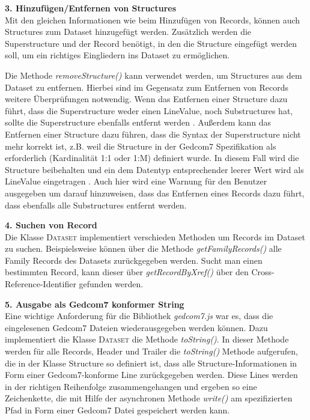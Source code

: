 \vspace{1em}
\textbf{3. Hinzufügen/Entfernen von Structures} \vspace{0.5em} \\
Mit den gleichen Informationen wie beim Hinzufügen von Records, können auch Structures zum Dataset hinzugefügt werden. Zusätzlich werden die Superstructure und der Record benötigt, in den die Structure eingefügt werden soll, um ein richtiges Eingliedern ins Dataset zu ermöglichen. 


Die Methode \textit{removeStructure()} kann verwendet werden, um Structures aus dem Dataset zu entfernen. Hierbei sind im Gegensatz zum Entfernen von Records weitere Überprüfungen notwendig. Wenn das Entfernen einer Structure dazu führt, dass die Superstructure weder einen LineValue, noch Substructures hat, sollte die Superstructure ebenfalls entfernt werden \cite{GEDCOM}. Außerdem kann das Entfernen einer Structure dazu führen, dass die Syntax der Superstructure nicht mehr korrekt ist, z.B. weil die Structure in der Gedcom7 Spezifikation als erforderlich (Kardinalität 1:1 oder 1:M) definiert wurde. In diesem Fall wird die Structure beibehalten und ein dem Datentyp entsprechender leerer Wert wird als LineValue eingetragen \cite{GEDCOM}. Auch hier wird eine Warnung für den Benutzer ausgegeben um darauf hinzuweisen, dass das Entfernen eines Records dazu führt, dass ebenfalls alle Substructures entfernt werden. 

\vspace{1em}
\textbf{4. Suchen von Record} \vspace{0.5em} \\
Die Klasse \textsc{Dataset} implementiert verschieden Methoden um Records im Dataset zu suchen. Beispielsweise können über die Methode \textit{getFamilyRecords()} alle Family Records des Datasets zurückgegeben werden. Sucht man einen bestimmten Record, kann dieser über \textit{getRecordByXref()} über den Cross-Reference-Identifier gefunden werden. 

\vspace{1em}
\textbf{5. Ausgabe als Gedcom7 konformer String} \vspace{0.5em} \\
Eine wichtige Anforderung für die Bibliothek \textit{gedcom7.js} war es, dass die eingelesenen Gedcom7 Dateien wiederausgegeben werden können. Dazu implementiert die Klasse \textsc{Dataset} die Methode \textit{toString()}. In dieser Methode werden für alle Records, Header und Trailer die \textit{toString()} Methode aufgerufen, die in der Klasse Structure so definiert ist, dass alle Structure-Informationen in Form einer Gedcom7-konforme Line zurückgegeben werden. Diese Lines werden in der richtigen Reihenfolge zusammengehangen und ergeben so eine Zeichenkette, die mit Hilfe der asynchronen Methode \textit{write()} am spezifizierten Pfad in Form einer Gedcom7 Datei gespeichert werden kann.


